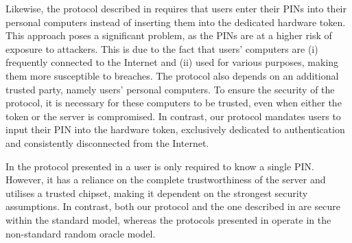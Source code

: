  
  Likewise, the protocol described in  \cite{JareckiJKSS21} requires that users enter their PINs into their personal computers instead of inserting them into the dedicated hardware token. This approach poses a significant problem, as the PINs are at a higher risk of exposure to attackers. This is due to the fact that users' computers are (i) frequently connected to the Internet and (ii) used for various purposes, making them more susceptible to breaches.
The protocol also depends on an additional trusted party, namely users' personal computers. To ensure the security of the protocol, it is necessary for these computers to be trusted, even when either the token or the server is compromised. In contrast, our protocol mandates users to input their PIN into the hardware token, exclusively dedicated to authentication and consistently disconnected from the Internet. 
 
 
 In the protocol presented in \cite{MatsuoMY11} a user is only required to know a single PIN. However, it has a reliance on the complete trustworthiness of the server and utilises a trusted chipset, making it dependent on the strongest security assumptions. In contrast, both our protocol and the one described in \cite{MatsuoMY11} are secure within the standard model, whereas the protocols presented in \cite{WangW18,JareckiJKSS21} operate in the non-standard random oracle model. 






